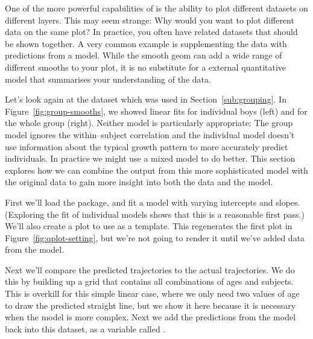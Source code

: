 One of the more powerful capabilities of \ggplot is the ability to plot different datasets on different layers.  This may seem strange: Why would you want to plot different data on the same plot?  In practice, you often have related datasets that should be shown together.  A very common example is supplementing the data with predictions from a model.  While the smooth geom can add a wide range of different smooths to your plot, it is no substitute for a external quantitative model that summarises your understanding of the data.

Let's look again at the  dataset which was used in Section~\ref{sub:grouping}.  In Figure~\ref{fig:group-smooths}, we showed linear fits for individual boys (left) and for the whole group (right).  Neither model is particularly appropriate: The group model ignores the within--subject correlation and the individual model doesn't use information about the typical growth pattern to more accurately predict individuals.  In practice we might use a mixed model to do better.  This section explores how we can combine the output from this more sophisticated model with the original data to gain more insight into both the data and the model.

First we'll load the  package, and fit a model with varying intercepts and slopes.  (Exploring the fit of individual models shows that this is a reasonable first pass.)  We'll also create a plot to use as a template.  This regenerates the first plot in Figure~\ref{fig:qplot-setting}, but we're not going to render it until we've added data from the model.

% 


Next we'll compare the predicted trajectories to the actual trajectories.  We do this by building up a grid that contains all combinations of ages and subjects.  This is overkill for this simple linear case, where we only need two values of age to draw the predicted straight line, but we show it here because it is necessary when the model is more complex.  Next we add the predictions from the model back into this dataset, as a variable called .  

% 
% 


